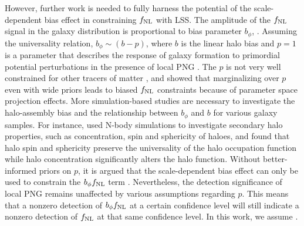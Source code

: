However, further work is needed to fully harness the potential of the scale-dependent bias effect in constraining $f_{\rm NL}$ with LSS. The amplitude of the $f_{\rm NL}$ signal in the galaxy distribution is proportional to   bias parameter $b_{\phi}$,  . Assuming the universality relation, $b_{\phi} \sim (b - p)$, where $b$ is the linear halo bias and $p=1$ is a parameter that describes the response of galaxy formation to primordial potential perturbations in the presence of local PNG \citep[see, e.g.,][]{slosar2008constraints}. The  $p$ is not very well constrained for other tracers of matter \citep{2020JCAP...12..013B, 2020JCAP...12..031B}, and \cite{2022JCAP...11..013B} showed that marginalizing over $p$ even with wide priors leads to biased $f_{\rm NL}$ constraints because of parameter space projection effects. More simulation-based studies are necessary to investigate the halo-assembly bias and the relationship between $b_{\phi}$ and $b$ for various galaxy samples. For instance, \cite{2023JCAP...01..023L} used N-body simulations to investigate secondary halo properties, such as concentration, spin and sphericity of haloes, and found that halo spin and sphericity preserve the universality of the halo occupation function while halo concentration significantly alters the halo function.  Without better-informed priors on $p$, it is argued that the scale-dependent bias effect can only  be used to constrain the $b_{\phi}f_{\rm NL}$ term \citep[see, e.g.,][]{2020JCAP...12..031B}. Nevertheless, the detection significance of local PNG remains unaffected by various assumptions regarding $p$. This means that a nonzero detection of $b_{\phi}f_{\rm NL}$ at a certain confidence level will still indicate a nonzero detection of $f_{\rm NL}$ at that same confidence level. In this work, we assume  .  

